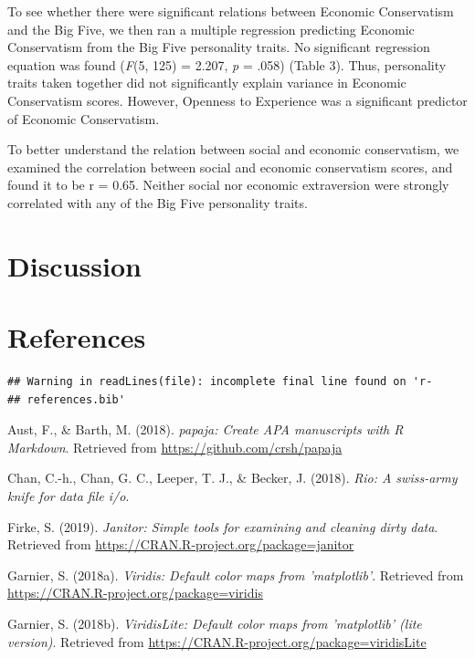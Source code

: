 \documentclass[man]{apa6}
\begin{document}
To see whether there were significant relations between Economic
Conservatism and the Big Five, we then ran a multiple regression
predicting Economic Conservatism from the Big Five personality traits.
No significant regression equation was found (\emph{F}(5, 125) = 2.207,
\emph{p} = .058) (Table 3). Thus, personality traits taken together did
not significantly explain variance in Economic Conservatism scores.
However, Openness to Experience was a significant predictor of Economic
Conservatism.

To better understand the relation between social and economic
conservatism, we examined the correlation between social and economic
conservatism scores, and found it to be r = 0.65. Neither social nor
economic extraversion were strongly correlated with any of the Big Five
personality traits.

\section{Discussion}\label{discussion}

\newpage

\section{References}\label{references}

\begin{verbatim}
## Warning in readLines(file): incomplete final line found on 'r-
## references.bib'
\end{verbatim}

\begingroup
\setlength{\parindent}{-0.5in} \setlength{\leftskip}{0.5in}

\hypertarget{refs}{}
\hypertarget{ref-R-papaja}{}
Aust, F., \& Barth, M. (2018). \emph{papaja: Create APA manuscripts with
R Markdown}. Retrieved from \url{https://github.com/crsh/papaja}

\hypertarget{ref-R-rio}{}
Chan, C.-h., Chan, G. C., Leeper, T. J., \& Becker, J. (2018).
\emph{Rio: A swiss-army knife for data file i/o}.

\hypertarget{ref-R-janitor}{}
Firke, S. (2019). \emph{Janitor: Simple tools for examining and cleaning
dirty data}. Retrieved from
\url{https://CRAN.R-project.org/package=janitor}

\hypertarget{ref-R-viridis}{}
Garnier, S. (2018a). \emph{Viridis: Default color maps from
'matplotlib'}. Retrieved from
\url{https://CRAN.R-project.org/package=viridis}

\hypertarget{ref-R-viridisLite}{}
Garnier, S. (2018b). \emph{ViridisLite: Default color maps from
'matplotlib' (lite version)}. Retrieved from
\url{https://CRAN.R-project.org/package=viridisLite}
\end{document}
